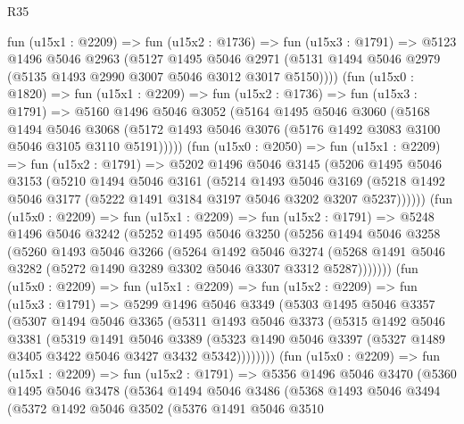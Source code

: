 \begin{lexlean}{R35}
\begin{coremodule}
    fun (u15x1 : @2209) =>
    fun (u15x2 : @1736) =>
    fun (u15x3 : @1791) =>
    @5123
      @1496
      @5046
      @2963
      (@5127
        @1495
        @5046
        @2971
        (@5131 @1494 @5046 @2979 (@5135 @1493 @2990 @3007 @5046 @3012 @3017 @5150))))
    (fun (u15x0 : @1820) =>
    fun (u15x1 : @2209) =>
    fun (u15x2 : @1736) =>
    fun (u15x3 : @1791) =>
    @5160
      @1496
      @5046
      @3052
      (@5164
        @1495
        @5046
        @3060
        (@5168
          @1494
          @5046
          @3068
          (@5172 @1493 @5046 @3076 (@5176 @1492 @3083 @3100 @5046 @3105 @3110 @5191)))))
    (fun (u15x0 : @2050) =>
    fun (u15x1 : @2209) =>
    fun (u15x2 : @1791) =>
    @5202
      @1496
      @5046
      @3145
      (@5206
        @1495
        @5046
        @3153
        (@5210
          @1494
          @5046
          @3161
          (@5214
            @1493
            @5046
            @3169
            (@5218 @1492 @5046 @3177 (@5222 @1491 @3184 @3197 @5046 @3202 @3207 @5237))))))
    (fun (u15x0 : @2209) =>
    fun (u15x1 : @2209) =>
    fun (u15x2 : @1791) =>
    @5248
      @1496
      @5046
      @3242
      (@5252
        @1495
        @5046
        @3250
        (@5256
          @1494
          @5046
          @3258
          (@5260
            @1493
            @5046
            @3266
            (@5264
              @1492
              @5046
              @3274
              (@5268 @1491 @5046 @3282 (@5272 @1490 @3289 @3302 @5046 @3307 @3312 @5287)))))))
    (fun (u15x0 : @2209) =>
    fun (u15x1 : @2209) =>
    fun (u15x2 : @2209) =>
    fun (u15x3 : @1791) =>
    @5299
      @1496
      @5046
      @3349
      (@5303
        @1495
        @5046
        @3357
        (@5307
          @1494
          @5046
          @3365
          (@5311
            @1493
            @5046
            @3373
            (@5315
              @1492
              @5046
              @3381
              (@5319
                @1491
                @5046
                @3389
                (@5323 @1490 @5046 @3397 (@5327 @1489 @3405 @3422 @5046 @3427 @3432 @5342))))))))
    (fun (u15x0 : @2209) =>
    fun (u15x1 : @2209) =>
    fun (u15x2 : @1791) =>
    @5356
      @1496
      @5046
      @3470
      (@5360
        @1495
        @5046
        @3478
        (@5364
          @1494
          @5046
          @3486
          (@5368
            @1493
            @5046
            @3494
            (@5372
              @1492
              @5046
              @3502
              (@5376
                @1491
                @5046
                @3510

\end{coremodule}
\end{lexlean}
